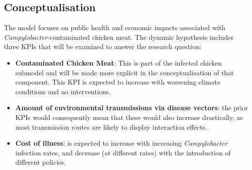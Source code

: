 \subsection{Conceptualisation}
\label{s:conceptualisation}
The model focuses on public health and economic impacts associated with \textit{Campylobacter}-contaminated chicken meat. The dynamic hypothesis includes three KPIs that will be examined to answer the research question: 
\begin{itemize}
    \item \textbf{Contaminated Chicken Meat}: This is part of the infected chicken submodel and will be made more explicit in the conceptualisation of that component. This KPI is expected to increase with worsening climate conditions and no interventions.
    \item \textbf{Amount of environmental transmissions via disease vectors}: the prior KPIs would consequently mean that these would also increase drastically, as most transmission routes are likely to display interaction effects.
    \item \textbf{Cost of illness}: is expected to increase with increasing \textit{Campylobacter} infection rates, and decrease (at different rates) with the introduction of different policies.
\end{itemize}
 

